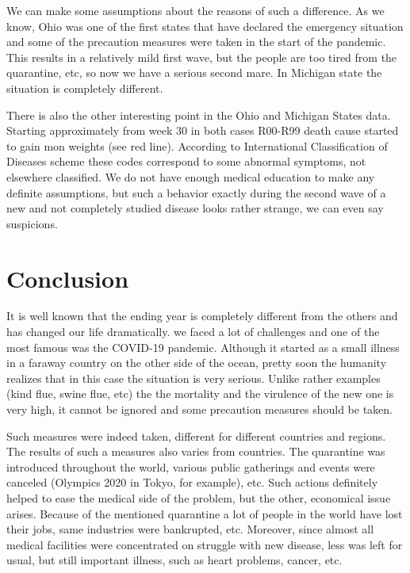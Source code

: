 \documentclass[conference]{IEEEtran}
\begin{document}
We can make some assumptions about the reasons of such a difference. As we know, Ohio was one of the first states that have declared the emergency situation and some of the precaution measures were taken in the start of the pandemic. This results in a relatively mild first wave, but the people are too tired from the quarantine, etc, so now we have a serious second mare. In Michigan state the situation is completely different.

There is also the other interesting point in the Ohio and Michigan States data. Starting approximately from week 30 in both cases R00-R99 death cause started to gain mon weights (see red line). According to  International Classification of Diseases scheme  \cite{cdc_international_nodate} these codes correspond to some abnormal symptoms, not elsewhere classified. We do not have enough medical education to make any definite assumptions, but such a behavior exactly during the second wave of a new and not completely studied disease looks rather strange, we can even say suspicions.




\section{Conclusion}

It is well known that the ending year is completely different from the others and has changed our life dramatically. we faced a lot of challenges and one of the most famous was the COVID-19 pandemic. Although it started as a small illness in a faraway country on the other side of the ocean, pretty soon the humanity realizes that in this case the situation is very serious. Unlike rather examples (kind flue, swine flue, etc) the the mortality and the virulence of the new one is very high, it cannot be ignored and some precaution measures should be taken.

Such measures were indeed taken, different for different countries and regions. The results of such a measures also varies from countries. The quarantine was introduced throughout the world, various public gatherings and events were canceled (Olympics 2020 in Tokyo, for example), etc. Such actions definitely helped to ease the medical side of the problem, but the other, economical issue arises. Because of the mentioned quarantine a lot of people in the world have lost their jobs, same industries were bankrupted, etc. Moreover, since almost all medical facilities were concentrated on struggle with new disease, less was left for usual, but still important illness, such as heart problems, cancer, etc.
\end{document}
